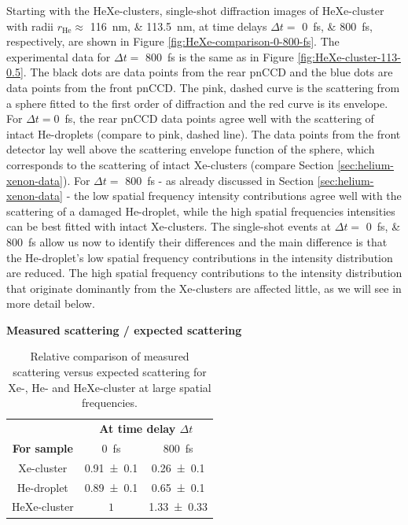 Starting with the HeXe-clusters, single-shot diffraction images of HeXe-cluster with radii $r_{\text{He}}\approx$ \SIlist{116;113.5}{\nano\meter}, at time delays $\Delta t =$ \SIlist{0;800}{\femto\second}, respectively, are shown in Figure \ref{fig:HeXe-comparison-0-800-fs}. The experimental data for $\Delta t =$ \SI{800}{\femto\second} is the same as in Figure \ref{fig:HeXe-cluster-113-0.5}. The black dots are data points from the rear pnCCD and the blue dots are data points from the front pnCCD. The pink, dashed curve is the scattering from a sphere fitted to the first order of diffraction and the red curve is its envelope. 
For $\Delta t=$\SI{0}{\femto\second}, the rear pnCCD data points agree well with the scattering of intact He-droplets (compare to pink, dashed line). The data points from the front detector lay well above the scattering envelope function of the sphere, which corresponds to the scattering of intact Xe-clusters (compare Section \ref{sec:helium-xenon-data}). For $\Delta t =$ \SI{800}{\femto\second} - as already discussed in Section \ref{sec:helium-xenon-data} - the low spatial frequency intensity contributions agree well with the scattering of a damaged He-droplet, while the high spatial frequencies intensities can be best fitted with intact Xe-clusters. The single-shot events at $\Delta t=$ \SIlist{0;800}{\femto\second} allow us now to identify their differences and the main difference is that the He-droplet's low spatial frequency contributions in the intensity distribution are reduced. The high spatial frequency contributions to the intensity distribution that originate dominantly from the Xe-clusters are affected little, as we will see in more detail below.\\[1\baselineskip]
%
\begin{table}%
\centering
\textbf{Measured scattering / expected scattering}\\
\begin{tabular}{ | c || c | c | }
\hline
	 &\multicolumn{2}{c|}{\textbf{At time delay $\Delta t$}} \\
	\textbf{For sample} & \SI{0}{\femto\second}  & \SI{800}{\femto\second} \\ \hline \hline
	Xe-cluster & \num{0.91 \pm 0.1} & \num{0.26 \pm  0.1} \\ \hline
	He-droplet & \num{0.89 \pm 0.1} & \num{0.65\pm   0.1} \\ \hline
	HeXe-cluster & $1$ & \num{1.33 \pm  0.33} \\ \hline
\end{tabular}
\caption[Relative comparison of measured scattering versus expected scattering.]{Relative comparison of measured scattering versus expected scattering for Xe-, He- and HeXe-cluster at large spatial frequencies.}
\label{tab:he-vs-xe-vs-hexe-summary}
\end{table}
